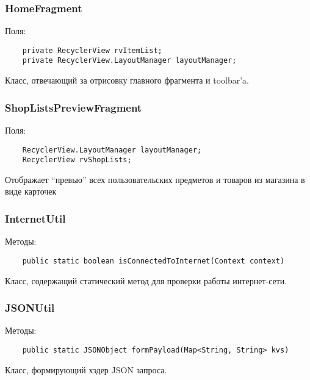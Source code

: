 \subsubsection{HomeFragment}
Поля:\\
\begin{small}
    \begin{verbatim}
    private RecyclerView rvItemList;
    private RecyclerView.LayoutManager layoutManager;
    \end{verbatim}
\end{small}
Класс, отвечающий за отрисовку главного фрагмента и toolbar'a.


\subsubsection{ShopListsPreviewFragment}
Поля:\\
\begin{small}
    \begin{verbatim}
    RecyclerView.LayoutManager layoutManager;
    RecyclerView rvShopLists;
    \end{verbatim}
\end{small}
Отображает ``превью'' всех пользовательских предметов и товаров из магазина в
виде карточек


\subsubsection{InternetUtil}
Методы:\\

\begin{small}
    \begin{verbatim}
    public static boolean isConnectedToInternet(Context context)
    \end{verbatim}
\end{small}
Класс, содержащий статический метод для проверки работы интернет-сети.

\subsubsection{JSONUtil}
Методы:\\

\begin{small}
    \begin{verbatim}
    public static JSONObject formPayload(Map<String, String> kvs)
    \end{verbatim}
\end{small}
Класс, формирующий хэдер JSON запроса.

